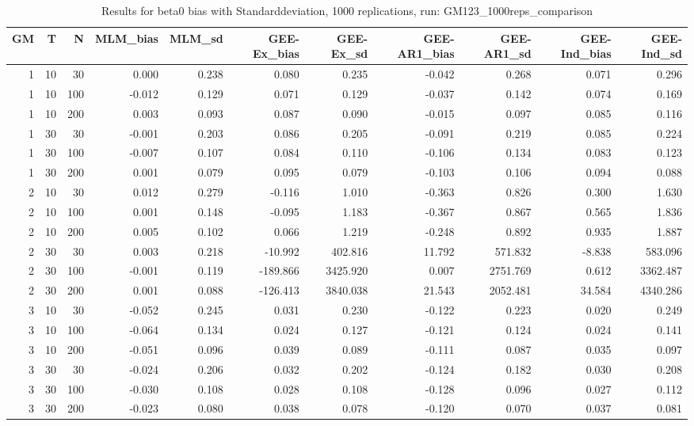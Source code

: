 \begin{table}[ht]
\centering
\begin{tabular}{rrrrrrrrrrr}
  \hline
GM & T & N & MLM\_bias & MLM\_sd & GEE-Ex\_bias & GEE-Ex\_sd & GEE-AR1\_bias & GEE-AR1\_sd & GEE-Ind\_bias & GEE-Ind\_sd \\ 
  \hline
1 & 10 & 30 & 0.000 & 0.238 & 0.080 & 0.235 & -0.042 & 0.268 & 0.071 & 0.296 \\ 
  1 & 10 & 100 & -0.012 & 0.129 & 0.071 & 0.129 & -0.037 & 0.142 & 0.074 & 0.169 \\ 
  1 & 10 & 200 & 0.003 & 0.093 & 0.087 & 0.090 & -0.015 & 0.097 & 0.085 & 0.116 \\ 
  1 & 30 & 30 & -0.001 & 0.203 & 0.086 & 0.205 & -0.091 & 0.219 & 0.085 & 0.224 \\ 
  1 & 30 & 100 & -0.007 & 0.107 & 0.084 & 0.110 & -0.106 & 0.134 & 0.083 & 0.123 \\ 
  1 & 30 & 200 & 0.001 & 0.079 & 0.095 & 0.079 & -0.103 & 0.106 & 0.094 & 0.088 \\ 
   \hline
2 & 10 & 30 & 0.012 & 0.279 & -0.116 & 1.010 & -0.363 & 0.826 & 0.300 & 1.630 \\ 
  2 & 10 & 100 & 0.001 & 0.148 & -0.095 & 1.183 & -0.367 & 0.867 & 0.565 & 1.836 \\ 
  2 & 10 & 200 & 0.005 & 0.102 & 0.066 & 1.219 & -0.248 & 0.892 & 0.935 & 1.887 \\ 
  2 & 30 & 30 & 0.003 & 0.218 & -10.992 & 402.816 & 11.792 & 571.832 & -8.838 & 583.096 \\ 
  2 & 30 & 100 & -0.001 & 0.119 & -189.866 & 3425.920 & 0.007 & 2751.769 & 0.612 & 3362.487 \\ 
  2 & 30 & 200 & 0.001 & 0.088 & -126.413 & 3840.038 & 21.543 & 2052.481 & 34.584 & 4340.286 \\ 
   \hline
3 & 10 & 30 & -0.052 & 0.245 & 0.031 & 0.230 & -0.122 & 0.223 & 0.020 & 0.249 \\ 
  3 & 10 & 100 & -0.064 & 0.134 & 0.024 & 0.127 & -0.121 & 0.124 & 0.024 & 0.141 \\ 
  3 & 10 & 200 & -0.051 & 0.096 & 0.039 & 0.089 & -0.111 & 0.087 & 0.035 & 0.097 \\ 
  3 & 30 & 30 & -0.024 & 0.206 & 0.032 & 0.202 & -0.124 & 0.182 & 0.030 & 0.208 \\ 
  3 & 30 & 100 & -0.030 & 0.108 & 0.028 & 0.108 & -0.128 & 0.096 & 0.027 & 0.112 \\ 
  3 & 30 & 200 & -0.023 & 0.080 & 0.038 & 0.078 & -0.120 & 0.070 & 0.037 & 0.081 \\ 
   \hline
\end{tabular}
\caption{Results for beta0 bias with Standarddeviation, 1000 replications, run: GM123_1000reps_comparison} 
\label{tab:beta0_bias_sd}
\end{table}
